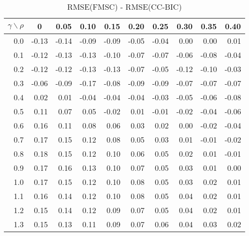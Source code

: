 \documentclass[12pt]{article}
\begin{document}
\begin{table}[!tbp]
\caption{RMSE(FMSC) - RMSE(CC-BIC)}
 \begin{center}
 \begin{tabular}{r|rrrrrrrrr}\hline\hline
\multicolumn{1}{c|}{$\gamma\backslash\rho$}&\multicolumn{1}{c}{0}&\multicolumn{1}{c}{0.05}&\multicolumn{1}{c}{0.10}&\multicolumn{1}{c}{0.15}&\multicolumn{1}{c}{0.20}&\multicolumn{1}{c}{0.25}&\multicolumn{1}{c}{0.30}&\multicolumn{1}{c}{0.35}&\multicolumn{1}{c}{0.40}\tabularnewline
\hline

0.0&-0.13&-0.14&-0.09&-0.09&-0.05&-0.04& 0.00& 0.00& 0.01\tabularnewline
0.1&-0.12&-0.13&-0.13&-0.10&-0.07&-0.07&-0.06&-0.08&-0.04\tabularnewline
0.2&-0.12&-0.12&-0.13&-0.13&-0.07&-0.05&-0.12&-0.10&-0.03\tabularnewline
0.3&-0.06&-0.09&-0.17&-0.08&-0.09&-0.09&-0.07&-0.07&-0.07\tabularnewline
0.4& 0.02& 0.01&-0.04&-0.04&-0.04&-0.03&-0.05&-0.06&-0.08\tabularnewline
0.5& 0.11& 0.07& 0.05&-0.02& 0.01&-0.01&-0.02&-0.04&-0.06\tabularnewline
0.6& 0.16& 0.11& 0.08& 0.06& 0.03& 0.02& 0.00&-0.02&-0.04\tabularnewline
0.7& 0.17& 0.15& 0.12& 0.08& 0.05& 0.03& 0.01&-0.01&-0.02\tabularnewline
0.8& 0.18& 0.15& 0.12& 0.10& 0.06& 0.05& 0.02& 0.01&-0.01\tabularnewline
0.9& 0.17& 0.16& 0.13& 0.10& 0.07& 0.05& 0.03& 0.01& 0.00\tabularnewline
1.0& 0.17& 0.15& 0.12& 0.10& 0.08& 0.05& 0.03& 0.02& 0.01\tabularnewline
1.1& 0.16& 0.14& 0.12& 0.10& 0.08& 0.05& 0.04& 0.02& 0.01\tabularnewline
1.2& 0.15& 0.14& 0.12& 0.09& 0.07& 0.05& 0.04& 0.02& 0.01\tabularnewline
1.3& 0.15& 0.13& 0.11& 0.09& 0.07& 0.06& 0.04& 0.03& 0.02\tabularnewline
\hline
\end{tabular}

\end{center}

\end{table}

%
\end{document}
